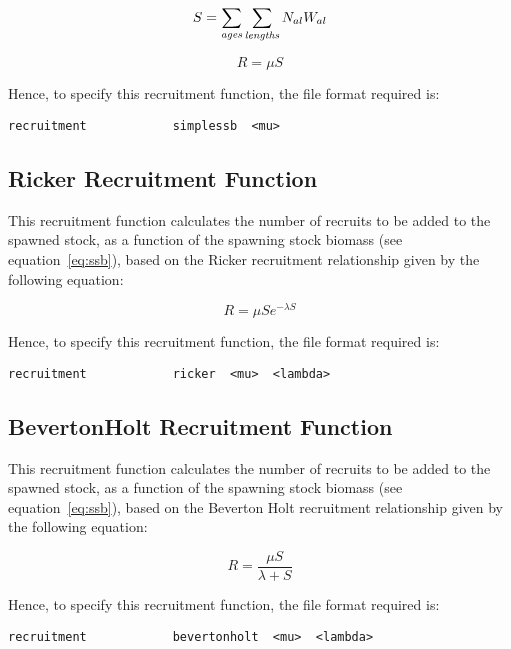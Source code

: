 \documentclass [a4paper, 10pt]{book}
\begin{document}
\begin{equation}\label{eq:ssb}
S = \sum_{\it ages}\sum_{\it lengths} N_{al} W_{al}
\end{equation}

\begin{equation}\label{eq:rec2}
R = \mu S
\end{equation}

Hence, to specify this recruitment function, the file format required is:

{\small\begin{verbatim}
recruitment            simplessb  <mu>
\end{verbatim}}

\subsection{Ricker Recruitment Function}
This recruitment function calculates the number of recruits to be added to the spawned stock, as a function of the spawning stock biomass (see equation~\ref{eq:ssb}), based on the Ricker recruitment relationship given by the following equation:

\begin{equation}\label{eq:rec3}
R = \mu S e ^{-\lambda S}
\end{equation}

Hence, to specify this recruitment function, the file format required is:

{\small\begin{verbatim}
recruitment            ricker  <mu>  <lambda>
\end{verbatim}}

\subsection{BevertonHolt Recruitment Function}
This recruitment function calculates the number of recruits to be added to the spawned stock, as a function of the spawning stock biomass (see equation~\ref{eq:ssb}), based on the Beverton Holt recruitment relationship given by the following equation:

\begin{equation}\label{eq:rec4}
R = \frac{\mu S}{\lambda + S}
\end{equation}

Hence, to specify this recruitment function, the file format required is:

{\small\begin{verbatim}
recruitment            bevertonholt  <mu>  <lambda>
\end{verbatim}}
\end{document}
